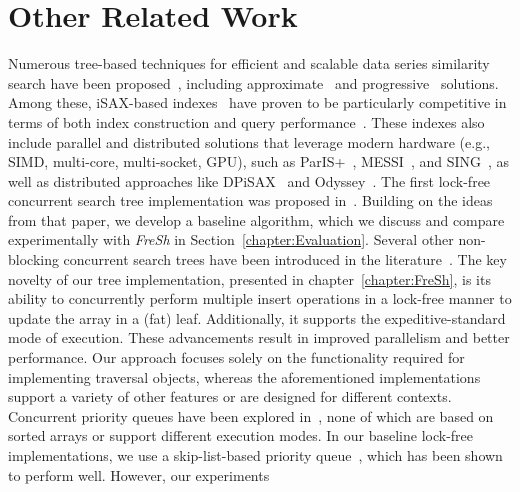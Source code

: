 \section{Other Related Work}
Numerous tree-based techniques for efficient and scalable data series similarity search
have been proposed~\cite{DBLP:journals/pvldb/EchihabiZPB18, DBLP:journals/pvldb/EchihabiZPB19,
DBLP:conf/edbt/EchihabiZP21, DBLP:journals/pvldb/EchihabiPZ21},
including approximate~\cite{DBLP:journals/pvldb/AziziEP23, 
DBLP:journals/kais/LevchenkoKYAMPS21} and 
progressive~\cite{DBLP:conf/sigmod/GogolouTEBP20, DBLP:journals/tvcg/JoSF20,
DBLP:conf/sigmod/LiZAH20, DBLP:journals/vldb/EchihabiTGBP23} solutions.
Among these, iSAX-based indexes~\cite{isaxfamily} have proven to be particularly
competitive in terms of both index construction and query performance~\cite{DBLP:journals/pvldb/EchihabiZPB18,
DBLP:journals/pvldb/EchihabiZPB19, hercules, odyssey, dumpy}. These indexes also include
parallel and distributed solutions that leverage modern hardware (e.g., SIMD, multi-core,
multi-socket, GPU), such as ParIS+~\cite{parisplus}, MESSI~\cite{PFP21-I}, and SING~\cite{PFP21-II},
as well as distributed approaches like DPiSAX~\cite{dpisax, dpisaxjournal} and
Odyssey~\cite{odyssey}.
% 
The first lock-free concurrent search tree implementation was proposed in~\cite{EFRB10}.
Building on the ideas from that paper, we develop a baseline algorithm, which we discuss
and compare experimentally with \textit{FreSh} in Section~\ref{chapter:Evaluation}.
Several other non-blocking concurrent search trees have been introduced in the 
literature~\cite{BER14, HL16, ABF20, HJ12, NRM20, CNT14, BP12, EFHR14, FR2018, ABF+22}.
The key novelty of our tree implementation, presented in chapter~\ref{chapter:FreSh}, is its
ability to concurrently perform multiple insert operations in a lock-free manner to
update the array in a (fat) leaf. Additionally, it supports the expeditive-standard mode
of execution. These advancements result in improved parallelism and better performance.
Our approach focuses solely on the functionality required for implementing traversal objects,
whereas the aforementioned implementations support a variety of other features or are designed
for different contexts.
% 
Concurrent priority queues have been explored in~\cite{AK15-I, RT21, WG15, SUNDELL2005609,
tamir_et_al, LJ13}, none of which are based on sorted arrays or support different
execution modes. In our baseline lock-free implementations, we use a skip-list-based
priority queue~\cite{LJ13}, which has been shown to perform well. However, our experiments
